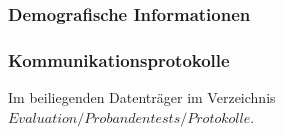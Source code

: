 \documentclass[
	12pt,
	a4paper,
	bibtotoc,
	cleardoubleempty, 
	idxtotoc,
	ngerman,
	openright
	final,
	listof=nochaptergap,
	]{scrbook}
\begin{document}
\begin{appendices}
\subsubsection{Demografische Informationen}\label{sec:append_study_demografic}



\subsubsection{Kommunikationsprotokolle}\label{sec:append_study_protocols}
Im beiliegenden Datenträger im Verzeichnis $Evaluation/Probandentests/Protokolle$. 



% 
% 
\end{appendices}
\end{document}
